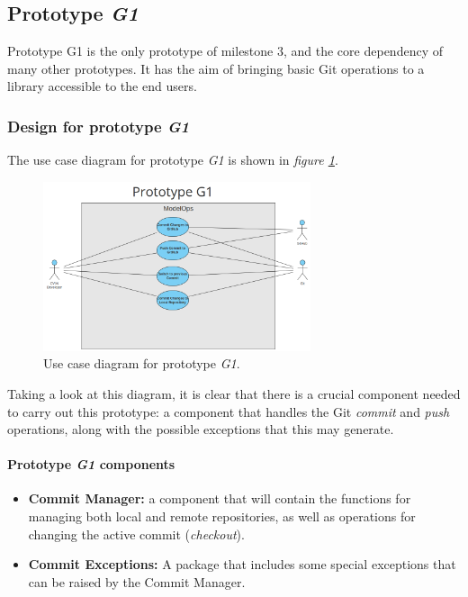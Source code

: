 \subsection{Prototype \emph{G1}}

Prototype G1 is the only prototype of milestone 3, and the core dependency of many other prototypes. It has the aim of bringing basic Git operations to a library accessible to the end users.

\subsubsection{Design for prototype \emph{G1}}

The use case diagram for prototype \emph{G1} is shown in \emph{figure \ref{fig:useCaseG1}}.

\begin{figure}[H]
    \centering
    \includegraphics[width=0.7\textwidth]{figs/use-case-G1.png}
    \caption{Use case diagram for prototype \emph{G1}.}
    \label{fig:useCaseG1}
\end{figure}

Taking a look at this diagram, it is clear that there is a crucial component needed to carry out this prototype: a component that handles the Git \emph{commit} and \emph{push} operations, along with
the possible exceptions that this may generate.

\paragraph{Prototype \emph{G1} components}

\begin{itemize}
    \item \textbf{Commit Manager: }a component that will contain the functions for managing both local and remote repositories, as well as operations for changing the active commit (\emph{checkout}).
    
    \item \textbf{Commit Exceptions: }A package that includes some special exceptions that can be raised by the Commit Manager.
\end{itemize}


